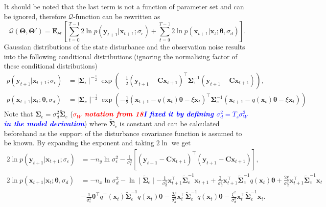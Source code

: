 \documentclass[]{article}
\newcommand{\dean}[1]{\textsf{\emph{\textbf{\textcolor{red}{#1}}}}}
\newcommand{\parham}[1]{\textsf{\emph{\textbf{\textcolor{blue}{#1}}}}}
\begin{document}
 It should be noted that the last term is not a function of parameter set and can be ignored, therefore $\mathcal Q$-function can be rewritten as
\begin{equation}\label{eq:QIntermsofJointDist}
\mathcal Q(\boldsymbol \Theta,\boldsymbol\Theta')=\mathbf E_{\Theta'}\left[\sum_{t=0}^{T-1}2\ln p(\mathbf y_{t+1}|\mathbf x_{t+1}; \sigma_{\epsilon})+\sum_{t=0}^{T-1}2\ln p(\mathbf x_{t+1}|\mathbf x_{t};\boldsymbol \theta ,\sigma_d)\right].
\end{equation}
Gaussian distributions of the state disturbance and the observation noise results into the following conditional distributions (ignoring the normalising factor of these conditional distributions)
\begin{align}
 p\left(\mathbf y_{t+1}|\mathbf x_{t+1};\sigma_{\epsilon}\right)&= \mid\boldsymbol\Sigma_{\epsilon}\mid^{-\frac{1}{2}}  \exp\left({-\frac{1}{2}\left(\mathbf y_{t+1}-\mathbf C\mathbf  x_{t+1}\right)^\top\boldsymbol\Sigma_{\epsilon}^{-1}\left(\mathbf y_{t+1}-\mathbf C\mathbf  x_{t+1}\right)}\right),\\
p(\mathbf x_{t+1}|\mathbf x_{t};\boldsymbol \theta ,\sigma_d)&= \mid\boldsymbol\Sigma_{e}\mid^{-\frac{1}{2}} \exp \left(-\frac{1}{2}(\mathbf x_{t+1}-q(\mathbf  x_t)\boldsymbol\theta-\xi  \mathbf x_t)^\top\boldsymbol\Sigma_e^{-1}(\mathbf x_{t+1}-q( \mathbf x_t)\boldsymbol\theta-\xi \mathbf  x_t) \right)
\end{align}
Note that $\boldsymbol\Sigma_e=\sigma_d^2\tilde{\boldsymbol\Sigma}_e$ (\dean{$\sigma_W$ notation from 18}\parham{I fixed it by defining $\sigma_d^2 =T_s\sigma^2_W$ in the model derivation}) where $\tilde{\boldsymbol\Sigma}_e$ is constant and can be calculated beforehand as the support of the disturbance covariance function is assumed to be known. By expanding the exponent and taking $2\ln$ we get
\begin{align}\label{eq:CondititionDist1}
2\ln p\left(\mathbf y_{t+1}|\mathbf x_{t+1};\sigma_{\epsilon}\right)&=-n_y\ln \sigma_{\epsilon}^2-\frac{1}{\sigma_{\epsilon}^2}\left[ (\mathbf y_{t+1}-\mathbf C\mathbf  x_{t+1})^\top(\mathbf y_{t+1}-\mathbf C\mathbf  x_{t+1})\right],  \\
2\ln p(\mathbf x_{t+1}|\mathbf x_{t};\boldsymbol \theta ,\sigma_d)&=-n_x\ln\sigma_d^2-\ln\mid\tilde{\boldsymbol\Sigma}_e\mid-\frac{1}{\sigma_d^2}\mathbf x_{t+1}^\top\tilde{\boldsymbol\Sigma}_e^{-1}\mathbf x_{t+1}+\frac{2}{\sigma_d^2}\mathbf x_{t+1}^\top\tilde{\boldsymbol\Sigma}_e^{-1}q( \mathbf x_t)\boldsymbol\theta+\frac{2\xi}{\sigma_d^2}\mathbf x_{t+1}^\top\tilde{\boldsymbol\Sigma}_e^{-1}\mathbf x_t \nonumber \\
&-\frac{1}{\sigma_e^2}\boldsymbol\theta^\top q^\top(\mathbf x_t)\tilde{\boldsymbol\Sigma}_e^{-1}q(\mathbf x_t)\boldsymbol\theta-\frac{2\xi}{\sigma_d^2} \mathbf x_t^\top\tilde{\boldsymbol\Sigma}_e^{-1}q(\mathbf x_t)\boldsymbol\theta-\frac{\xi^2}{\sigma_d^2}\mathbf x_t^\top\tilde{\boldsymbol\Sigma}_e^{-1}\mathbf x_t. \label{eq:CondititionDist2}
\end{align}
\end{document}

